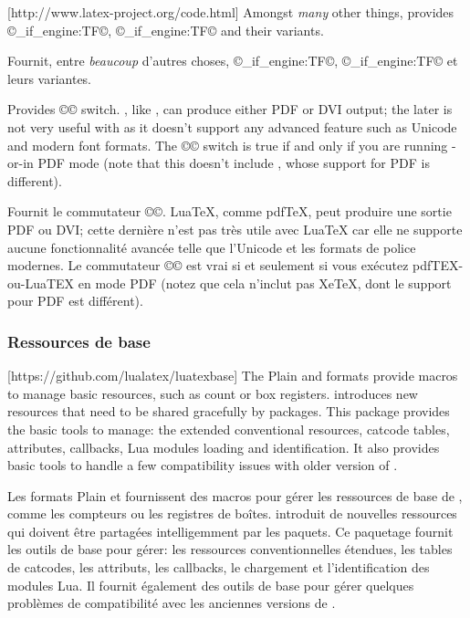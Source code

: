 \documentclass{lltxdoc}
\begin{document}
[http://www.latex-project.org/code.html]
Amongst \emph{many} other things, provides ©\luatex_if_engine:TF©,
©\xetex_if_engine:TF© and their variants.

Fournit, entre \emph{beaucoup} d'autres choses, ©\luatex_if_engine:TF©, ©\xetex_if_engine:TF© et leurs variantes.

Provides ©\ifpdf© switch. \luatex, like \pdftex, can produce either PDF or DVI
output; the later is not very useful with \luatex as it doesn't support any
advanced feature such as Unicode and modern font formats. The ©\ifpdf© switch
is true if and only if you are running \pdftex-or-\luatex in PDF mode (note
that this doesn't include \xetex, whose support for PDF is different).

Fournit le commutateur ©\ifpdf©. LuaTeX, comme pdfTeX, peut produire une sortie PDF ou DVI; cette dernière n'est pas très utile avec LuaTeX car elle ne supporte aucune fonctionnalité avancée telle que l'Unicode et les formats de police modernes. Le commutateur ©\ifpdf© est vrai si et seulement si vous exécutez pdfTEX-ou-LuaTEX en mode PDF (notez que cela n'inclut pas XeTeX, dont le support pour PDF est différent).

\subsubsection{Ressources de base}

[https://github.com/lualatex/luatexbase]
The Plain and \latex formats provide macros to manage \tex basic resources,
such as count or box registers. \luatex introduces new resources that need to
be shared gracefully by packages. This package provides the basic tools to
manage: the extended conventional \tex resources, catcode tables, attributes,
callbacks, Lua modules loading and identification. It also provides basic
tools to handle a few compatibility issues with older version of \luatex.

Les formats Plain et \latex fournissent des macros pour gérer les ressources de base de \tex, comme les compteurs ou les registres de boîtes. \luatex introduit de nouvelles ressources qui doivent être partagées intelligemment par les paquets. Ce paquetage fournit les outils de base pour gérer: les ressources \tex conventionnelles étendues, les tables de catcodes, les attributs, les callbacks, le chargement et l'identification des modules Lua. Il fournit également des outils de base pour gérer quelques problèmes de compatibilité avec les anciennes versions de \luatex.
\end{document}
